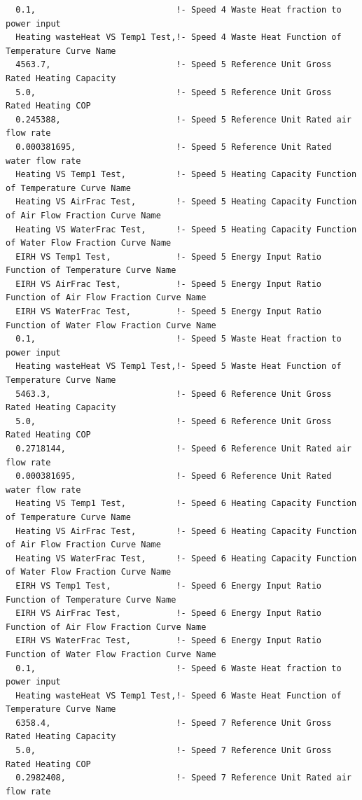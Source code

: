 \begin{lstlisting}
  0.1,                            !- Speed 4 Waste Heat fraction to power input
  Heating wasteHeat VS Temp1 Test,!- Speed 4 Waste Heat Function of Temperature Curve Name
  4563.7,                         !- Speed 5 Reference Unit Gross Rated Heating Capacity
  5.0,                            !- Speed 5 Reference Unit Gross Rated Heating COP
  0.245388,                       !- Speed 5 Reference Unit Rated air flow rate
  0.000381695,                    !- Speed 5 Reference Unit Rated water flow rate
  Heating VS Temp1 Test,          !- Speed 5 Heating Capacity Function of Temperature Curve Name
  Heating VS AirFrac Test,        !- Speed 5 Heating Capacity Function of Air Flow Fraction Curve Name
  Heating VS WaterFrac Test,      !- Speed 5 Heating Capacity Function of Water Flow Fraction Curve Name
  EIRH VS Temp1 Test,             !- Speed 5 Energy Input Ratio Function of Temperature Curve Name
  EIRH VS AirFrac Test,           !- Speed 5 Energy Input Ratio Function of Air Flow Fraction Curve Name
  EIRH VS WaterFrac Test,         !- Speed 5 Energy Input Ratio Function of Water Flow Fraction Curve Name
  0.1,                            !- Speed 5 Waste Heat fraction to power input
  Heating wasteHeat VS Temp1 Test,!- Speed 5 Waste Heat Function of Temperature Curve Name
  5463.3,                         !- Speed 6 Reference Unit Gross Rated Heating Capacity
  5.0,                            !- Speed 6 Reference Unit Gross Rated Heating COP
  0.2718144,                      !- Speed 6 Reference Unit Rated air flow rate
  0.000381695,                    !- Speed 6 Reference Unit Rated water flow rate
  Heating VS Temp1 Test,          !- Speed 6 Heating Capacity Function of Temperature Curve Name
  Heating VS AirFrac Test,        !- Speed 6 Heating Capacity Function of Air Flow Fraction Curve Name
  Heating VS WaterFrac Test,      !- Speed 6 Heating Capacity Function of Water Flow Fraction Curve Name
  EIRH VS Temp1 Test,             !- Speed 6 Energy Input Ratio Function of Temperature Curve Name
  EIRH VS AirFrac Test,           !- Speed 6 Energy Input Ratio Function of Air Flow Fraction Curve Name
  EIRH VS WaterFrac Test,         !- Speed 6 Energy Input Ratio Function of Water Flow Fraction Curve Name
  0.1,                            !- Speed 6 Waste Heat fraction to power input
  Heating wasteHeat VS Temp1 Test,!- Speed 6 Waste Heat Function of Temperature Curve Name
  6358.4,                         !- Speed 7 Reference Unit Gross Rated Heating Capacity
  5.0,                            !- Speed 7 Reference Unit Gross Rated Heating COP
  0.2982408,                      !- Speed 7 Reference Unit Rated air flow rate

\end{lstlisting}
